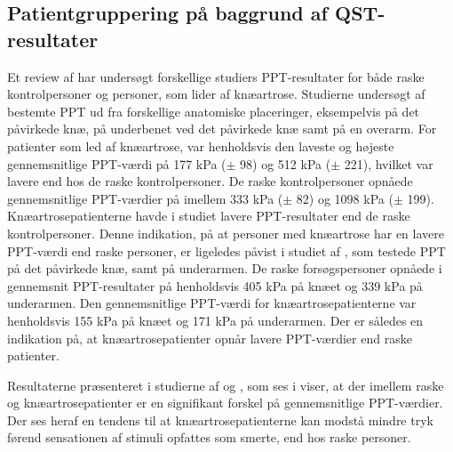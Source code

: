 \subsection{Patientgruppering på baggrund af QST-resultater}
Et review af  har undersøgt forskellige studiers PPT-resultater for både raske kontrolpersoner og personer, som lider af knæartrose. Studierne undersøgt af  bestemte PPT ud fra forskellige anatomiske placeringer, eksempelvis på det påvirkede knæ, på underbenet ved det påvirkede knæ samt på en overarm. For patienter som led af knæartrose, var henholdsvis den laveste og højeste gennemsnitlige PPT-værdi på 177 kPa ($\pm$ 98) og 512 kPa ($\pm$ 221), hvilket var lavere end hos de raske kontrolpersoner. De raske kontrolpersoner opnåede gennemsnitlige PPT-værdier på imellem 333 kPa ($\pm$ 82) og 1098 kPa ($\pm$ 199). Knæartrosepatienterne havde i studiet lavere PPT-resultater end de raske kontrolpersoner. \citep{Suokas2012} Denne indikation, på at personer med knæartrose har en lavere PPT-værdi end raske personer, er ligeledes påvist i studiet af , som testede PPT på det påvirkede knæ, samt på underarmen. De raske forsøgspersoner opnåede i gennemsnit PPT-resultater på henholdsvis 405 kPa på knæet og 339 kPa på underarmen. Den gennemsnitlige PPT-værdi for knæartrosepatienterne var henholdsvis 155 kPa på knæet og 171 kPa på underarmen. Der er således en indikation på, at knæartrosepatienter opnår lavere PPT-værdier end raske patienter. \citep{Suokas2012} \citep{Wylde2013}

\begin{table}[H]
	\centering
	\caption{I tabellen ses resultaterne vedrørende PPT-målinger på henholdsvis raske personer og knæartrosepatienter.}
	\label{tab:PPT_rask_syg}
\end{table}\vspace{-.25cm}

Resultaterne præsenteret i studierne af  og , som ses i  viser, at der imellem raske og knæartrosepatienter er en signifikant forskel på gennemsnitlige PPT-værdier. Der ses heraf en tendens til at knæartrosepatienterne kan modstå mindre tryk førend sensationen af stimuli opfattes som smerte, end hos raske personer.

